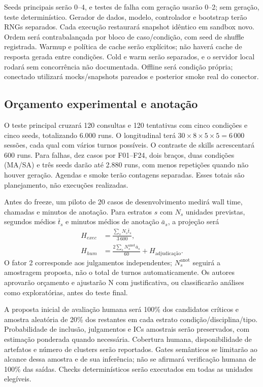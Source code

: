 \documentclass[12pt]{article}
\begin{document}
Seeds principais serão 0--4, e testes de falha com geração usarão 0--2; sem geração, teste determinístico. Gerador de dados, modelo, controlador e bootstrap terão RNGs separados. Cada execução restaurará snapshot idêntico em sandbox novo. Ordem será contrabalançada por bloco de caso/condição, com seed de shuffle registrada. Warmup e política de cache serão explícitos; não haverá cache de resposta gerada entre condições. Cold e warm serão separados, e o servidor local rodará sem concorrência não documentada. Offline será condição própria; conectado utilizará mocks/snapshots pareados e posterior smoke real do conector.

\subsection{Orçamento experimental e anotação}

O teste principal cruzará 120 consultas e 120 tentativas com cinco condições e cinco seeds, totalizando 6.000 runs. O longitudinal terá $30\times8\times5\times5=6\,000$ sessões, cada qual com vários turnos possíveis. O contraste de skills acrescentará 600 runs. Para falhas, dez casos por F01--F24, dois braços, duas condições (MA/SA) e três seeds darão até 2.880 runs, com menos repetições quando não houver geração. Agendas e smoke terão contagens separadas. Esses totais são planejamento, não execuções realizadas.

Antes do freeze, um piloto de 20 casos de desenvolvimento medirá wall time, chamadas e minutos de anotação. Para estratos $s$ com $N_s$ unidades previstas, segundos médios $\bar t_s$ e minutos médios de anotação $\bar a_s$, a projeção será
\begin{align}
 H_{exec}&=\frac{\sum_s N_s\bar t_s}{3\,600},\\
 H_{hum}&=\frac{2\sum_s N^{\mathrm{anot}}_s\bar a_s}{60}+H_{\text{adjudicação}}.
\end{align}
O fator 2 corresponde aos julgamentos independentes; $N^{\mathrm{anot}}_s$ seguirá a amostragem proposta, não o total de turnos automaticamente. Os autores aprovarão orçamento e ajustarão N com justificativa, ou classificarão análises como exploratórias, antes do teste final.

A proposta inicial de avaliação humana será 100\% dos candidatos críticos e amostra aleatória de 20\% dos restantes em cada estrato condição/disciplina/tipo. Probabilidade de inclusão, julgamentos e ICs amostrais serão preservados, com estimação ponderada quando necessária. Cobertura humana, disponibilidade de artefatos e número de clusters serão reportados. Gates semânticos se limitarão ao alcance dessa amostra e de sua inferência; não se afirmará verificação humana de 100\% das saídas. Checks determinísticos serão executados em todas as unidades elegíveis.
\end{document}
